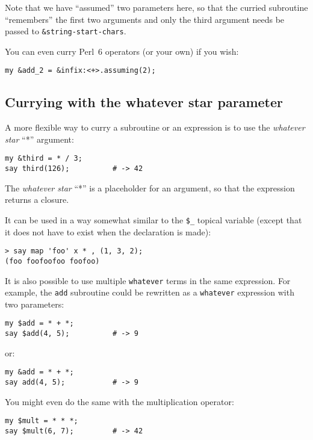 Note that we have ``assumed'' two parameters here, so 
that the curried subroutine ``remembers'' the first 
two arguments and only the third argument needs be 
passed to \verb'&string-start-chars'.

You can even curry Perl~6 operators (or your own) if 
you wish:

\begin{verbatim}
my &add_2 = &infix:<+>.assuming(2);
\end{verbatim}

\subsection{Currying with the whatever star parameter}
\label{whatever star parameter}

A more flexible way to curry a subroutine or an expression 
is to use the \emph{whatever star} ``*'' argument:

\begin{verbatim}
my &third = * / 3; 
say third(126);          # -> 42
\end{verbatim}

The \emph{whatever star} ``*'' is a placeholder for 
an argument, so that the expression returns 
a closure.

It can be used in a way somewhat similar to the \verb'$_' 
topical variable (except that it does not have to exist 
when the declaration is made):

\begin{verbatim}
> say map 'foo' x * , (1, 3, 2);
(foo foofoofoo foofoo)
\end{verbatim}

It is also possible to use multiple {\tt whatever} terms 
in the same expression. For example, the {\tt add} 
subroutine could be rewritten as a {\tt whatever} 
expression with two parameters:

\begin{verbatim}
my $add = * + *;
say $add(4, 5);          # -> 9
\end{verbatim}

or:

\begin{verbatim}
my &add = * + *;
say add(4, 5);           # -> 9
\end{verbatim}

You might even do the same with the multiplication operator:

\begin{verbatim}
my $mult = * * *;
say $mult(6, 7);         # -> 42
\end{verbatim}

